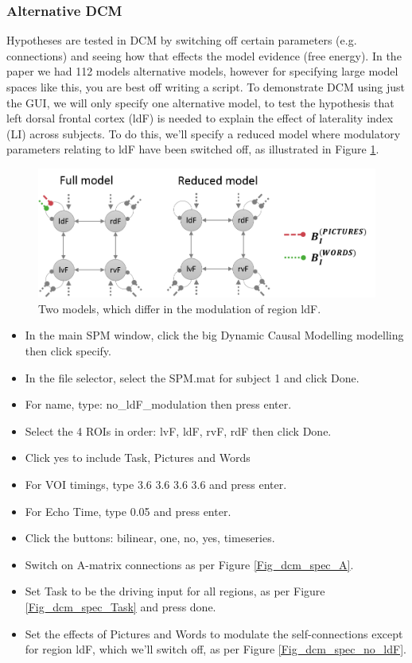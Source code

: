 \documentclass{article}
\begin{document}
\subsubsection{Alternative DCM} \label{GUI_altDCM}
Hypotheses are tested in DCM by switching off certain parameters (e.g. connections) and seeing how that effects the model evidence (free energy). In the paper we had 112 models alternative models, however for specifying large model spaces like this, you are best off writing a script. To demonstrate DCM using just the GUI, we will only specify one alternative model, to test the hypothesis that left dorsal frontal cortex (ldF) is needed to explain the effect of laterality index (LI) across subjects. To do this, we'll specify a reduced model where modulatory parameters relating to ldF have been switched off, as illustrated in Figure \ref{Fig_dcm_spec_2models}.

\begin{figure}[ht]
\begin{center}
\includegraphics{"Fig_dcm_spec_2models"}
\caption{Two models, which differ in the modulation of region ldF.\label{Fig_dcm_spec_2models}}
\end{center}
\end{figure}



\begin{itemize}
    \item In the main SPM window, click the big Dynamic Causal Modelling modelling then click specify.
    \item In the file selector, select the SPM.mat for subject 1 and click Done.
    \item For name, type: no\_ldF\_modulation then press enter.
    \item Select the 4 ROIs in order: lvF, ldF, rvF, rdF then click Done.
    \item Click yes to include Task, Pictures and Words
    \item For VOI timings, type 3.6  3.6  3.6  3.6 and press enter. 
    \item For Echo Time, type 0.05 and press enter.
    \item Click the buttons: bilinear, one, no, yes, timeseries.
    \item Switch on A-matrix connections as per Figure \ref{Fig_dcm_spec_A}.
    \item Set Task to be the driving input for all regions, as per Figure \ref{Fig_dcm_spec_Task} and press done.
    \item Set the effects of Pictures and Words to modulate the self-connections except for region ldF, which we'll switch off, as per Figure \ref{Fig_dcm_spec_no_ldF}.
\end{itemize}
\end{document}
